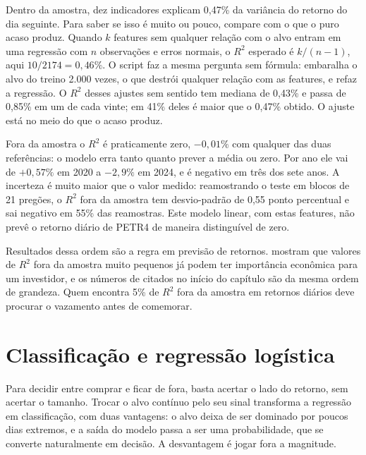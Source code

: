 Dentro da amostra, dez indicadores explicam 0,47\% da variância do retorno do dia seguinte. Para saber se isso é muito ou pouco, compare com o que o puro acaso produz. Quando $k$ features sem qualquer relação com o alvo entram em uma regressão com $n$ observações e erros normais, o $R^2$ esperado é $k/(n-1)$, aqui $10/2174 = 0,46\%$. O script faz a mesma pergunta sem fórmula: embaralha o alvo do treino 2.000 vezes, o que destrói qualquer relação com as features, e refaz a regressão. O $R^2$ desses ajustes sem sentido tem mediana de 0,43\% e passa de 0,85\% em um de cada vinte; em 41\% deles é maior que o 0,47\% obtido. O ajuste está no meio do que o acaso produz.

Fora da amostra o $R^2$ é praticamente zero, $-0,01\%$ com qualquer das duas referências: o modelo erra tanto quanto prever a média ou zero. Por ano ele vai de $+0,57\%$ em 2020 a $-2,9\%$ em 2024, e é negativo em três dos sete anos. A incerteza é muito maior que o valor medido: reamostrando o teste em blocos de 21 pregões, o $R^2$ fora da amostra tem desvio-padrão de 0,55 ponto percentual e sai negativo em 55\% das reamostras. Este modelo linear, com estas features, não prevê o retorno diário de PETR4 de maneira distinguível de zero.

Resultados dessa ordem são a regra em previsão de retornos. \citet{campbell2008} mostram que valores de $R^2$ fora da amostra muito pequenos já podem ter importância econômica para um investidor, e os números de \citet{gu2020} citados no início do capítulo são da mesma ordem de grandeza. Quem encontra 5\% de $R^2$ fora da amostra em retornos diários deve procurar o vazamento antes de comemorar.

\section{Classificação e regressão logística}

Para decidir entre comprar e ficar de fora, basta acertar o lado do retorno, sem acertar o tamanho. Trocar o alvo contínuo pelo seu sinal transforma a regressão em classificação, com duas vantagens: o alvo deixa de ser dominado por poucos dias extremos, e a saída do modelo passa a ser uma probabilidade, que se converte naturalmente em decisão. A desvantagem é jogar fora a magnitude.


